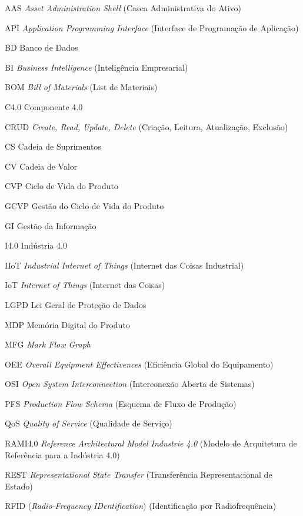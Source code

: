 \begin{siglas}
	\item[AAS] \textit{Asset Administration Shell} (Casca Administrativa do Ativo)
	\item[API] \textit{Application Programming Interface} (Interface de Programação de Aplicação)
	\item[BD] Banco de Dados
	\item[BI] \textit{Business Intelligence} (Inteligência Empresarial)
	\item[BOM] \textit{Bill of Materials} (List de Materiais)
	\item[C4.0] Componente 4.0
	\item[CRUD] \textit{Create, Read, Update, Delete} (Criação, Leitura, Atualização, Exclusão)
	\item[CS] Cadeia de Suprimentos
	\item[CV] Cadeia de Valor
	\item[CVP] Ciclo de Vida do Produto
	\item[GCVP] Gestão do Ciclo de Vida do Produto
	\item[GI] Gestão da Informação
	\item[I4.0] Indústria 4.0
	\item[IIoT] \textit{Industrial Internet of Things} (Internet das Coisas Industrial)
	\item[IoT] \textit{Internet of Things} (Internet das Coisas)
	\item[LGPD] Lei Geral de Proteção de Dados
	\item[MDP] Memória Digital do Produto
	\item[MFG] \textit{Mark Flow Graph}
	\item[OEE] \textit{Overall Equipment Effectivences} (Eficiência Global do Equipamento)
	\item[OSI] \textit{Open System Interconnection} (Interconexão Aberta de Sistemas)
	\item[PFS] \textit{Production Flow Schema} (Esquema de Fluxo de Produção)
	\item[QoS] \textit{Quality of Service} (Qualidade de Serviço)
	\item[RAMI4.0] \textit{Reference Architectural Model Industrie 4.0} (Modelo de Arquitetura de Referência para a Indústria 4.0)
	\item[REST] \textit{Representational State Transfer} (Transferência Representacional de Estado)
	\item[RFID] (\textit{Radio-Frequency IDentification}) (Identificação por Radiofrequência)

\end{siglas}
